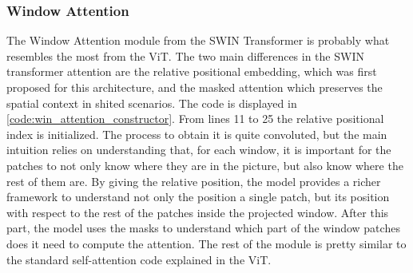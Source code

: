 \subsubsection{Window Attention}
\label{sec:window_attention}
The Window Attention module from the SWIN Transformer is probably what resembles the most from the ViT. The  two main differences in the SWIN transformer attention are the relative positional embedding, which was first proposed for this architecture, and the masked attention which preserves the spatial context in shited scenarios. The code is displayed in \ref{code:win_attention_constructor}. From lines 11 to 25 the relative positional index is initialized. The process to obtain it is quite convoluted, but the main intuition relies on understanding that, for each window, it is important for the patches to not only know where they are in the picture, but also know where the rest of them are. By giving the relative position, the model provides a richer framework to understand not only the position a single patch, but its position with respect to the rest of the patches inside the projected window. After this part, the model uses the masks to understand which part of the window patches does it need to compute the attention. The rest of the module is pretty similar to the standard self-attention code explained in the ViT.

